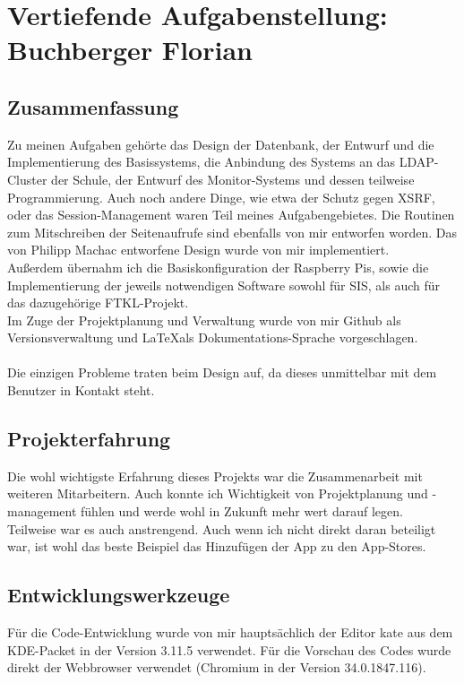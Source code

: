 \chapter[Buchberger]{Vertiefende Aufgabenstellung:\\Buchberger Florian}

\section{Zusammenfassung}
Zu meinen Aufgaben gehörte das Design der Datenbank, der Entwurf und die Implementierung des Basissystems, die Anbindung des Systems an das LDAP-Cluster der Schule, der Entwurf des Monitor-Systems und dessen teilweise Programmierung. Auch noch andere Dinge, wie etwa der Schutz gegen XSRF, oder das Session-Management waren Teil meines Aufgabengebietes. Die Routinen zum Mitschreiben der Seitenaufrufe sind ebenfalls von mir entworfen worden. Das von Philipp Machac entworfene Design wurde von mir implementiert.\\
Außerdem übernahm ich die Basiskonfiguration der Raspberry Pis, sowie die Implementierung der jeweils notwendigen Software sowohl für SIS, als auch für das dazugehörige FTKL-Projekt.\\
Im Zuge der Projektplanung und Verwaltung wurde von mir Github als Versionsverwaltung und \LaTeX  als Dokumentations-Sprache vorgeschlagen.\\
\\
Die einzigen Probleme traten beim Design auf, da dieses unmittelbar mit dem Benutzer in Kontakt steht.
\section{Projekterfahrung}
Die wohl wichtigste Erfahrung dieses Projekts war die Zusammenarbeit mit weiteren Mitarbeitern. Auch konnte ich Wichtigkeit von Projektplanung und -management fühlen und werde wohl in Zukunft mehr wert darauf legen.\\
Teilweise war es auch anstrengend. Auch wenn ich nicht direkt daran beteiligt war, ist wohl das beste Beispiel das Hinzufügen der App zu den App-Stores.

\section{Entwicklungswerkzeuge}
Für die Code-Entwicklung wurde von mir hauptsächlich der Editor kate aus dem KDE-Packet in der Version 3.11.5 verwendet. Für die Vorschau des Codes wurde direkt der Webbrowser verwendet (Chromium in der Version 34.0.1847.116).

